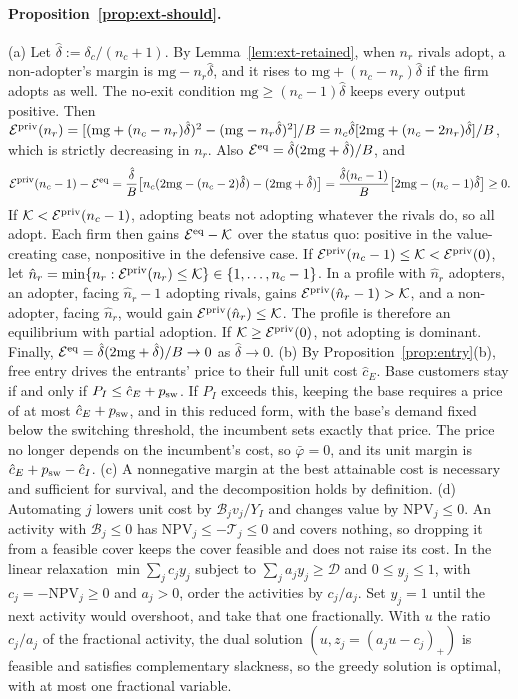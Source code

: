 \paragraph{Proposition~\ref{prop:ext-should}.} (a) Let $\hat\delta:=\delta_c/(n_c+1)$. By Lemma~\ref{lem:ext-retained}, when $n_r$ rivals adopt, a non-adopter's margin is $\mathrm{mg}-n_r\hat\delta$, and it rises to $\mathrm{mg}+(n_c-n_r)\hat\delta$ if the firm adopts as well. The no-exit condition $\mathrm{mg}\ge(n_c-1)\hat\delta$ keeps every output positive. Then $\mathcal E^{\rm priv}(n_r)=[(\mathrm{mg}+(n_c-n_r)\hat\delta)^2-(\mathrm{mg}-n_r\hat\delta)^2]/B=n_c\hat\delta[2\mathrm{mg}+(n_c-2n_r)\hat\delta]/B$, which is strictly decreasing in $n_r$. Also $\mathcal E^{\rm eq}=\hat\delta(2\mathrm{mg}+\hat\delta)/B$, and
\[
\mathcal E^{\rm priv}(n_c-1)-\mathcal E^{\rm eq}=\frac{\hat\delta}{B}\bigl[n_c(2\mathrm{mg}-(n_c-2)\hat\delta)-(2\mathrm{mg}+\hat\delta)\bigr]=\frac{\hat\delta(n_c-1)}{B}\bigl[2\mathrm{mg}-(n_c-1)\hat\delta\bigr]\ge0.
\]
If $\mathcal K<\mathcal E^{\rm priv}(n_c-1)$, adopting beats not adopting whatever the rivals do, so all adopt. Each firm then gains $\mathcal E^{\rm eq}-\mathcal K$ over the status quo: positive in the value-creating case, nonpositive in the defensive case. If $\mathcal E^{\rm priv}(n_c-1)\le\mathcal K<\mathcal E^{\rm priv}(0)$, let $\hat n_r=\min\{n_r:\mathcal E^{\rm priv}(n_r)\le\mathcal K\}\in\{1,\dots,n_c-1\}$. In a profile with $\hat n_r$ adopters, an adopter, facing $\hat n_r-1$ adopting rivals, gains $\mathcal E^{\rm priv}(\hat n_r-1)>\mathcal K$, and a non-adopter, facing $\hat n_r$, would gain $\mathcal E^{\rm priv}(\hat n_r)\le\mathcal K$. The profile is therefore an equilibrium with partial adoption. If $\mathcal K\ge\mathcal E^{\rm priv}(0)$, not adopting is dominant. Finally, $\mathcal E^{\rm eq}=\hat\delta(2\mathrm{mg}+\hat\delta)/B\to0$ as $\hat\delta\to0$.
(b) By Proposition~\ref{prop:entry}(b), free entry drives the entrants' price to their full unit cost $\hat c_E$. Base customers stay if and only if $P_I\le\hat c_E+p_{\rm sw}$. If $P_I$ exceeds this, keeping the base requires a price of at most $\hat c_E+p_{\rm sw}$, and in this reduced form, with the base's demand fixed below the switching threshold, the incumbent sets exactly that price. The price no longer depends on the incumbent's cost, so $\bar\varphi=0$, and its unit margin is $\hat c_E+p_{\rm sw}-\hat c_I$.
(c) A nonnegative margin at the best attainable cost is necessary and sufficient for survival, and the decomposition holds by definition.
(d) Automating $j$ lowers unit cost by $\mathcal B_jv_j/Y_I$ and changes value by $\mathrm{NPV}_j\le0$. An activity with $\mathcal B_j\le0$ has $\mathrm{NPV}_j\le-\mathcal T_j\le0$ and covers nothing, so dropping it from a feasible cover keeps the cover feasible and does not raise its cost. In the linear relaxation $\min\sum_jc_jy_j$ subject to $\sum_ja_jy_j\ge\mathcal D$ and $0\le y_j\le1$, with $c_j=-\mathrm{NPV}_j\ge0$ and $a_j>0$, order the activities by $c_j/a_j$. Set $y_j=1$ until the next activity would overshoot, and take that one fractionally. With $u$ the ratio $c_j/a_j$ of the fractional activity, the dual solution $(u,z_j=(a_ju-c_j)_+)$ is feasible and satisfies complementary slackness, so the greedy solution is optimal, with at most one fractional variable.
